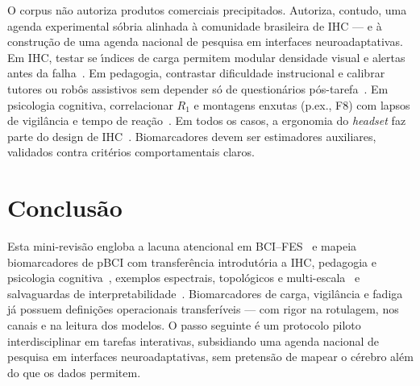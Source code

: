 \documentclass[12pt]{article}
\begin{document}
O corpus n\~{a}o autoriza produtos comerciais precipitados. Autoriza, contudo, uma agenda experimental s\'{o}bria alinhada \`{a} comunidade brasileira de IHC --- e \`{a} constru\c{c}\~{a}o de uma agenda nacional de pesquisa em interfaces neuroadaptativas. Em IHC, testar se \'{\i}ndices de carga permitem modular densidade visual e alertas antes da falha~\cite{Arico2017,Arico2016ATM}. Em pedagogia, contrastar dificuldade instrucional e calibrar tutores ou rob\^{o}s assistivos sem depender s\'{o} de question\'{a}rios p\'{o}s-tarefa~\cite{Arico2017,Arif2023}. Em psicologia cognitiva, correlacionar $R_1$ e montagens enxutas (p.ex., F8) com lapsos de vigil\^{a}ncia e tempo de rea\c{c}\~{a}o~\cite{Arif2023}. Em todos os casos, a ergonomia do \textit{headset} faz parte do design de IHC~\cite{Arico2017,Arif2023}. Biomarcadores devem ser estimadores auxiliares, validados contra crit\'{e}rios comportamentais claros.

\section{Conclus\~{a}o}

Esta mini-revis\~{a}o engloba a lacuna atencional em BCI--FES~\cite{Faria2026} e mapeia biomarcadores de pBCI com transfer\^{e}ncia introdut\'{o}ria a IHC, pedagogia e psicologia cognitiva~\cite{Arico2017,Zander2016,Arico2016ATM}, exemplos espectrais, topol\'{o}gicos e multi-escala~\cite{Arif2023,Rutkowski2023,Ko2021} e salvaguardas de interpretabilidade~\cite{Haufe2014,Lotte2018}. Biomarcadores de carga, vigil\^{a}ncia e fadiga j\'{a} possuem defini\c{c}\~{o}es operacionais transfer\'{i}veis --- com rigor na rotulagem, nos canais e na leitura dos modelos. O passo seguinte \'{e} um protocolo piloto interdisciplinar em tarefas interativas, subsidiando uma agenda nacional de pesquisa em interfaces neuroadaptativas, sem pretens\~{a}o de mapear o c\'{e}rebro al\'{e}m do que os dados permitem.



\end{document}
